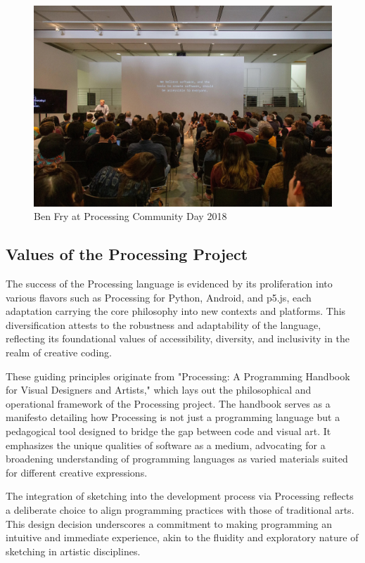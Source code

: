   \begin{figure}[h]
    \centering
    \includegraphics[width=1\textwidth]{images/pcd_la_2019.jpeg}
    \caption[Ben Fry at PCD 2018]{Ben Fry at Processing Community Day 2018}
  \end{figure}
  
\subsection{Values of the Processing Project}

The success of the Processing language is evidenced by its proliferation into various flavors such as Processing for Python, Android, and p5.js, each adaptation carrying the core philosophy into new contexts and platforms. This diversification attests to the robustness and adaptability of the language, reflecting its foundational values of accessibility, diversity, and inclusivity in the realm of creative coding.

These guiding principles originate from "Processing: A Programming Handbook for Visual Designers and Artists,"\parencite{reasProcessingProgrammingHandbook2007a} which lays out the philosophical and operational framework of the Processing project. The handbook serves as a manifesto detailing how Processing is not just a programming language but a pedagogical tool designed to bridge the gap between code and visual art. It emphasizes the unique qualities of software as a medium, advocating for a broadening understanding of programming languages as varied materials suited for different creative expressions.

The integration of sketching into the development process via Processing reflects a deliberate choice to align programming practices with those of traditional arts. This design decision underscores a commitment to making programming an intuitive and immediate experience, akin to the fluidity and exploratory nature of sketching in artistic disciplines.

